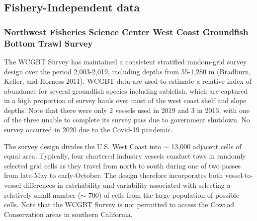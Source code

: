 \documentclass[11pt,
  english,
  a4paper,
]{article}
\begin{document}
\tagstructend


\hypertarget{fishery-independent-data}{%
\subsection{Fishery-Independent data}\label{fishery-independent-data}}

\leavevmode\tagmcend\tagstructend


\hypertarget{northwest-fisheries-science-center-west-coast-groundfish-bottom-trawl-survey}{%
\subsubsection{Northwest Fisheries Science Center West Coast Groundfish Bottom Trawl Survey}\label{northwest-fisheries-science-center-west-coast-groundfish-bottom-trawl-survey}}

\leavevmode\tagmcend\tagstructend


The WCGBT Survey has maintained a consistent stratified random-grid survey design over the period 2,003-2,019, including depths from 55-1,280 m {(Bradburn, Keller, and Horness 2011)\leavevmode\tagmcend\tagstructend}. WCGBT data are used to estimate a relative index of abundance for several groundfish species including sablefish, which are captured in a high proportion of survey hauls over most of the west coast shelf and slope depths. Note that there were only 2 vessels used in 2019 and 3 in 2013, with one of the three unable to complete its survey pass due to government shutdown. No survey occurred in 2020 due to the Covid-19 pandemic.

\leavevmode\tagmcend\tagstructend\par


The survey design divides the U.S. West Coast into {\(\sim\)\leavevmode\tagmcend\tagstructend} 13,000 adjacent cells of equal area. Typically, four chartered industry vessels conduct tows in randomly selected grid cells as they travel from north to south during one of two passes from late-May to early-October. The design therefore incorporates both vessel-to-vessel differences in catchability and variability associated with selecting a relatively small number ({\(\sim\)\leavevmode\tagmcend\tagstructend} 700) of cells from the large population of possible cells. Note that the WCGBT Survey is not permitted to access the Cowcod Conservation areas in southern California.
\end{document}
